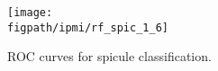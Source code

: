 
\begin{figure}
\centering
\texttt{[image: \\figpath/ipmi/rf\_spic\_1\_6]}
%
\caption{ROC curves for spicule classification.}
\label{f:detection_roc}
\end{figure}

